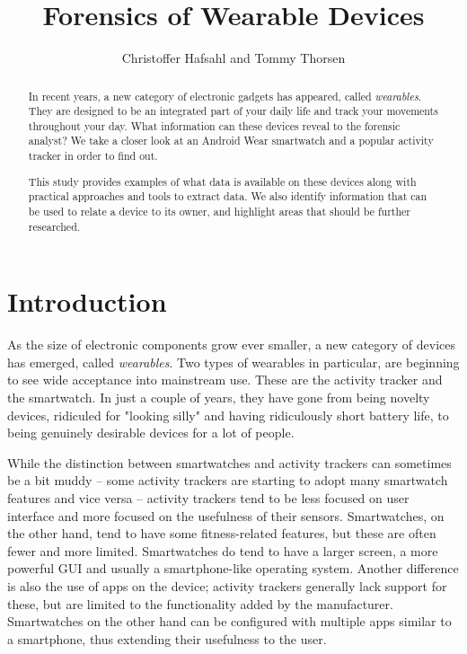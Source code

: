 \documentclass[a4paper,11pt,dvips]{article}
\begin{document}
\title{Forensics of Wearable Devices}
\author{Christoffer Hafsahl and Tommy Thorsen}
\maketitle


\begin{abstract}
In recent years, a new category of electronic gadgets has appeared, called \textit{wearables}. They are designed to be an integrated part of your daily life and track your movements throughout your day. What information can these devices reveal to the forensic analyst? We take a closer look at an Android Wear smartwatch and a popular activity tracker in order to find out.

This study provides examples of what data is available on these devices along with practical approaches and tools to extract data. We also identify information that can be used to relate a device to its owner, and highlight areas that should be further researched.
\end{abstract}


\section{Introduction}

As the size of electronic components grow ever smaller, a new category of devices has emerged, called \textit{wearables}. Two types of wearables in particular, are beginning to see wide acceptance into mainstream use. These are the activity tracker and the smartwatch. In just a couple of years, they have gone from being novelty devices, ridiculed for "looking silly" and having ridiculously short battery life, to being genuinely desirable devices for a lot of people. 

While the distinction between smartwatches and activity trackers can sometimes be a bit muddy -- some activity trackers are starting to adopt many smartwatch features and vice versa -- activity trackers tend to be less focused on user interface and more focused on the usefulness of their sensors. Smartwatches, on the other hand, tend to have some fitness-related features, but these are often fewer and more limited. Smartwatches do tend to have a larger screen, a more powerful GUI and usually a smartphone-like operating system. Another difference is also the use of apps on the device; activity trackers generally lack support for these, but are limited to the functionality added by the manufacturer. Smartwatches on the other hand can be configured with multiple apps similar to a smartphone, thus extending their usefulness to the user. 
\end{document}
